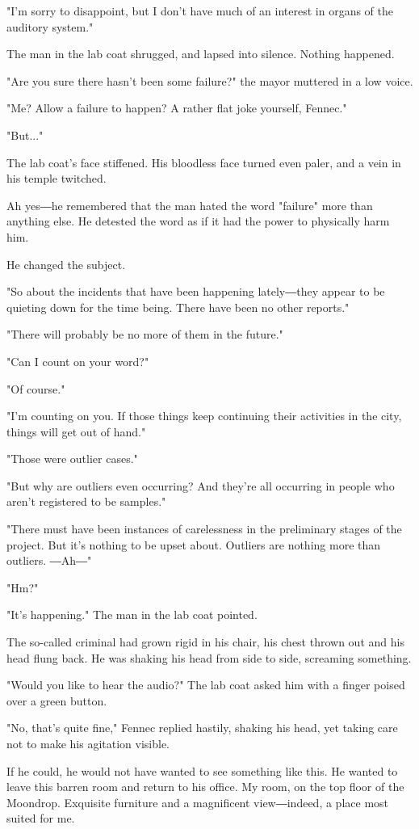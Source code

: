 "I'm sorry to disappoint, but I don't have much of an interest in organs
of the auditory system."

The man in the lab coat shrugged, and lapsed into silence. Nothing
happened.

"Are you sure there hasn't been some failure?" the mayor muttered in a
low voice.

"Me? Allow a failure to happen? A rather flat joke yourself, Fennec."

"But..."

The lab coat's face stiffened. His bloodless face turned even paler, and
a vein in his temple twitched.

Ah yes―he remembered that the man hated the word "failure" more than
anything else. He detested the word as if it had the power to physically
harm him.

He changed the subject.

"So about the incidents that have been happening lately―they appear to
be quieting down for the time being. There have been no other reports."

"There will probably be no more of them in the future."

"Can I count on your word?"

"Of course."

"I'm counting on you. If those things keep continuing their activities
in the city, things will get out of hand."

"Those were outlier cases."

"But why are outliers even occurring? And they're all occurring in
people who aren't registered to be samples."

"There must have been instances of carelessness in the preliminary
stages of the project. But it's nothing to be upset about. Outliers are
nothing more than outliers. ―Ah―"

"Hm?"

"It's happening." The man in the lab coat pointed.

The so-called criminal had grown rigid in his chair, his chest thrown
out and his head flung back. He was shaking his head from side to side,
screaming something.

"Would you like to hear the audio?" The lab coat asked him with a finger
poised over a green button.

"No, that's quite fine," Fennec replied hastily, shaking his head, yet
taking care not to make his agitation visible.

If he could, he would not have wanted to see something like this. He
wanted to leave this barren room and return to his office. My room, on
the top floor of the Moondrop. Exquisite furniture and a magnificent
view―indeed, a place most suited for me.

